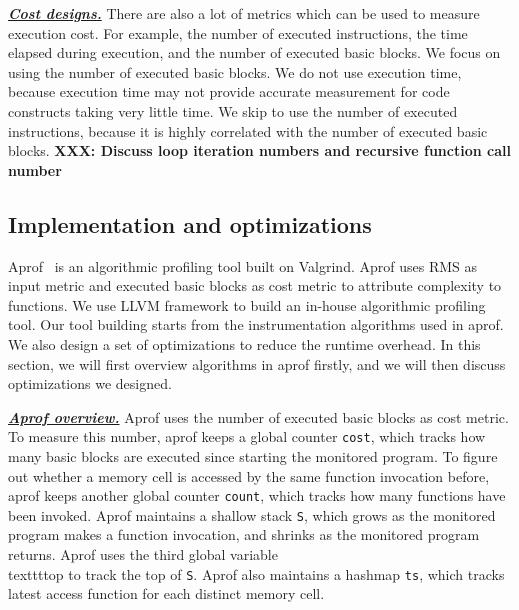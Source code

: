 {{{\bf{\underline{\textit{Cost designs.}}}}
There are also a lot of metrics which can be used to measure execution cost. 
For example, the number of executed instructions, 
the time elapsed during execution, 
and the number of executed basic blocks. 
We focus on using the number of executed basic blocks. 
We do not use execution time, 
because execution time may not provide accurate measurement 
for code constructs taking very little time.
We skip to use the number of executed instructions, 
because it is highly correlated with the number of executed basic blocks. 
{\bf XXX: Discuss loop iteration numbers and recursive function call number}

\subsection{Implementation and optimizations}


Aprof~\cite{Aprof1, Aprof2} is an algorithmic profiling tool built on Valgrind. 
Aprof uses RMS as input metric and executed basic blocks as cost metric 
to attribute complexity to functions. 
We use LLVM framework to build an in-house algorithmic profiling tool.
Our tool building starts from the instrumentation algorithms used in aprof. 
We also design a set of optimizations to reduce the runtime overhead.
In this section, we will first overview algorithms in aprof firstly, 
and we will then discuss optimizations we designed. 

{{{\bf{\underline{\textit{Aprof overview.}}}}
Aprof uses the number of executed basic blocks as cost metric.
To measure this number, aprof keeps a global counter \texttt{cost}, 
which tracks how many basic blocks are executed since 
starting the monitored program.
To figure out whether a memory cell is accessed by the same function invocation before,
aprof keeps another global counter \texttt{count}, 
which tracks how many functions have been invoked.  
Aprof maintains a shallow stack \texttt{S}, 
which grows as the monitored program makes a function invocation, 
and shrinks as the monitored program returns. 
Aprof uses the third global variable \\texttt{top} to track the top of \texttt{S}.
Aprof also maintains a hashmap \texttt{ts}, 
which tracks latest access function for each distinct memory cell. 

}}}}
